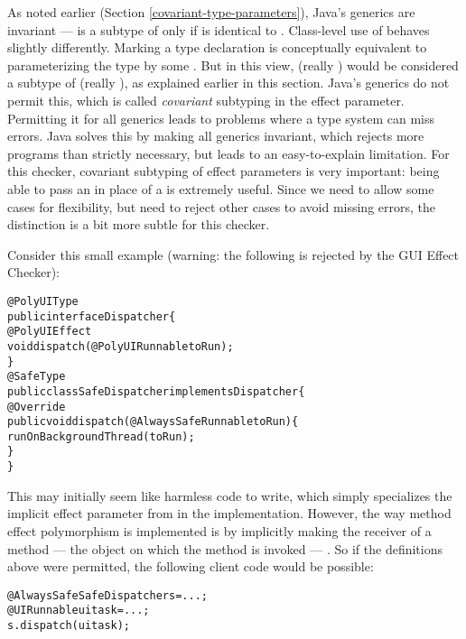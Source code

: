 As noted earlier (Section \ref{covariant-type-parameters}), Java's generics are invariant ---
 is a subtype of  only if  is identical to .
Class-level use of  behaves slightly differently.
Marking a type declaration  is conceptually
equivalent to parameterizing the type by some .  But in this view,
 (really ) would be considered a subtype of
 (really ), as explained earlier in this section.  Java's
generics do not permit this, which is called \emph{covariant} subtyping in the effect parameter.
Permitting it for all generics leads to problems where a type system can miss errors.  Java solves
this by making all generics invariant, which rejects more programs than strictly necessary, but
leads to an easy-to-explain limitation.  For this checker, covariant subtyping of effect parameters
is very important: being able to pass an  in place of a  is extremely useful.  Since we need to allow some
cases for flexibility, but need to reject other cases to avoid missing errors, the distinction is a
bit more subtle for this checker.

Consider this small example (warning: the following is rejected by the GUI Effect Checker):

\begin{alltt}
@PolyUIType
public interface Dispatcher \{
    @PolyUIEffect
    void dispatch(@PolyUI Runnable toRun);
\}
@SafeType
public class SafeDispatcher implements Dispatcher \{
    @Override
    public void dispatch(@AlwaysSafe Runnable toRun) \{
        runOnBackgroundThread(toRun);
    \}
\}
\end{alltt}

This may initially seem like harmless code to write, which simply specializes the implicit effect
parameter from  in the  implementation.  However, the way
method effect polymorphism is implemented is by implicitly making the receiver of a
 method --- the object on which the method is invoked --- .  So
if the definitions above were permitted, the following client code would be possible:

\begin{alltt}
@AlwaysSafe SafeDispatcher s = ...;
@UI Runnable uitask = ...;
s.dispatch(uitask);
\end{alltt}


